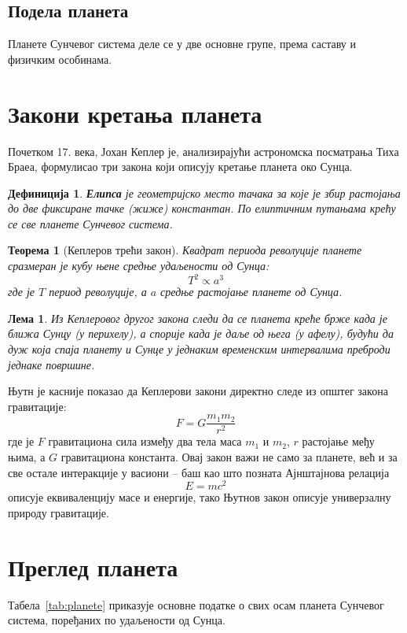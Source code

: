 \documentclass[12pt,a4paper]{article}
\newtheorem{teorema}{Теорема}
\newtheorem{definicija}{Дефиниција}
\newtheorem{lema}{Лема}
\begin{document}
\subsection{Подела планета}

Планете Сунчевог система деле се у две основне групе, према саставу и
физичким особинама.

\section{Закони кретања планета}

Почетком 17. века, Јохан Кеплер је, анализирајући астрономска
посматрања Тиха Браеа, формулисао три закона који описују кретање
планета око Сунца.

\begin{definicija}
\textbf{Елипса} је геометријско место тачака за које је збир
растојања до две фиксиране тачке (жиже) константан. По елиптичним
путањама крећу се све планете Сунчевог система.
\end{definicija}

\begin{teorema}[Кеплеров трећи закон]
Квадрат периода револуције планете сразмеран је кубу њене средње
удаљености од Сунца:
\[
T^2 \propto a^3
\]
где је $T$ период револуције, а $a$ средње растојање планете од Сунца.
\end{teorema}

\begin{lema}
Из Кеплеровог другог закона следи да се планета креће брже када је
ближа Сунцу (у перихелу), а спорије када је даље од њега (у афелу),
будући да дуж која спаја планету и Сунце у једнаким временским
интервалима преброди једнаке површине.
\end{lema}

Њутн је касније показао да Кеплерови закони директно следе из општег
закона гравитације:
\[
F = G \frac{m_1 m_2}{r^2}
\]
где је $F$ гравитациона сила између два тела маса $m_1$ и $m_2$, $r$
растојање међу њима, а $G$ гравитациона константа. Овај закон важи не
само за планете, већ и за све остале интеракције у васиони -- баш као
што позната Ајнштајнова релација
\[
E = mc^2
\]
описује еквиваленцију масе и енергије, тако Њутнов закон описује
универзалну природу гравитације.

\section{Преглед планета}

Табела~\ref{tab:planete} приказује основне податке о свих осам
планета Сунчевог система, поређаних по удаљености од Сунца.
\end{document}
